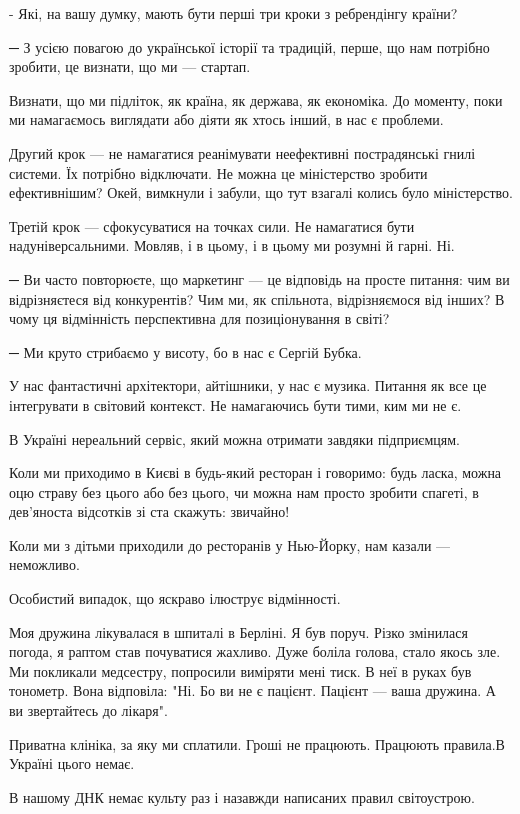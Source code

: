 - Які, на вашу думку, мають бути перші три кроки з ребрендінгу країни? 

─ З усією повагою до української історії та традицій, перше, що нам потрібно зробити, це визнати, що ми --- стартап. 

Визнати, що ми підліток, як країна, як держава, як економіка. До моменту, поки
ми намагаємось виглядати або діяти як хтось інший, в нас є проблеми.

Другий крок --- не намагатися реанімувати неефективні пострадянські гнилі
системи. Їх потрібно відключати. Не можна це міністерство зробити ефективнішим?
Окей, вимкнули і забули, що тут взагалі колись було міністерство.

Третій крок --- сфокусуватися на точках сили. Не намагатися бути
надуніверсальними. Мовляв, і в цьому, і в цьому ми розумні й гарні. Ні.

─ Ви часто повторюєте, що маркетинг --- це відповідь на просте питання: чим ви
відрізняєтеся від конкурентів? Чим ми, як спільнота, відрізняємося від інших? В
чому ця відмінність перспективна для позиціонування в світі?

─ Ми круто стрибаємо у висоту, бо в нас є Сергій Бубка.

У нас фантастичні архітектори, айтішники, у нас є музика. Питання як все це
інтегрувати в світовий контекст. Не намагаючись бути тими, ким ми не є.

В Україні нереальний сервіс, який можна отримати завдяки підприємцям.

Коли ми приходимо в Києві в будь-який ресторан і говоримо: будь ласка, можна
оцю страву без цього або без цього, чи можна нам просто зробити спагеті, в
дев’яноста відсотків зі ста скажуть: звичайно!

Коли ми з дітьми приходили до ресторанів у Нью-Йорку, нам казали --- неможливо.

Особистий випадок, що яскраво ілюструє відмінності.

Моя дружина лікувалася в шпиталі в Берліні. Я був поруч. Різко змінилася
погода, я раптом став почуватися жахливо. Дуже боліла голова, стало якось зле.
Ми покликали медсестру, попросили виміряти мені тиск. В неї в руках був
тонометр. Вона відповіла: "Ні. Бо ви не є пацієнт. Пацієнт --- ваша дружина. А ви
звертайтесь до лікаря".

Приватна клініка, за яку ми сплатили. Гроші не працюють. Працюють правила.В
Україні цього немає. 

В нашому ДНК немає культу раз і назавжди написаних правил світоустрою.

